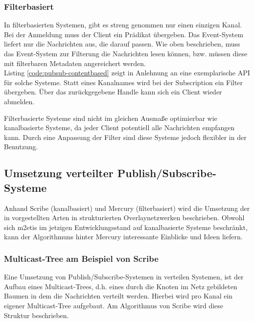 \subsubsection{Filterbasiert}
\label{chap:grundlagen:pubsub:filterbased}
In filterbasierten Systemen, gibt es streng genommen nur einen einzigen Kanal. Bei der Anmeldung muss der Client ein Prädikat übergeben. Das Event-System liefert nur die Nachrichten aus, die darauf passen. Wie oben beschrieben, muss das Event-System zur Filterung die Nachrichten lesen können, bzw. müssen diese mit filterbaren Metadaten angereichert werden.\\
Listing \ref{code:pubsub-contentbased} zeigt in Anlehnung an \cite{PiEyKoSh2007-PubSubAPI} eine exemplarische API für solche Systeme. Statt eines Kanalnames wird bei der Subscription ein Filter übergeben. Über das zurückgegebene Handle kann sich ein Client wieder abmelden.

Filterbasierte Systeme sind nicht im gleichen Ausmaße optimierbar wie kanalbasierte Systeme, da jeder Client potentiell alle Nachrichten empfangen kann. Durch eine Anpassung der Filter sind diese Systeme jedoch flexibler in der Benutzung.




\subsection{Umsetzung verteilter Publish/Subscribe-Systeme}
Anhand Scribe (kanalbasiert) \cite{Castro2002Scribe} und Mercury (filterbasiert) \cite{Bharambe2004Mercury} wird die Umsetzung der in  vorgestellten Arten in strukturierten Overlaynetzwerken beschrieben. Obwohl sich \ac{m2etis} im jetzigen Entwicklungsstand auf kanalbasierte Systeme beschränkt, kann der Algorithmuns hinter Mercury interessante Einblicke und Ideen liefern.

\subsubsection*{Multicast-Tree am Beispiel von Scribe}
\label{chap:related:scribe}
Eine Umsetzung von Publish/Subscribe-Systemen in verteilen Systemen, ist der Aufbau eines Multicast-Trees, d.h. eines durch die Knoten im Netz gebildeten Baumen in dem die Nachrichten verteilt werden. Hierbei wird pro Kanal ein eigener Multicast-Tree aufgebaut. Am Algorithmus von Scribe wird diese Struktur beschrieben.

